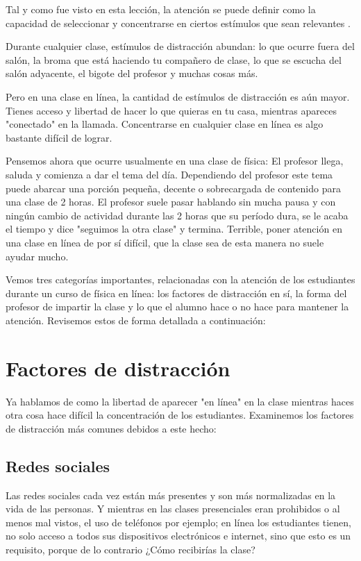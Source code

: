 Tal y como fue visto en esta lección, la atención se puede definir como la capacidad de seleccionar y concentrarse en ciertos estímulos que sean relevantes \cite{AtenCognifit}.

Durante cualquier clase, estímulos de distracción abundan: lo que  ocurre fuera del salón, la broma que está haciendo tu compañero de clase, lo que se escucha del salón adyacente, el bigote del profesor y muchas cosas más. 

Pero en una clase en línea, la cantidad de estímulos de distracción es aún mayor. Tienes acceso y libertad de hacer lo que quieras en tu casa, mientras apareces "conectado" en la llamada. Concentrarse en cualquier clase en línea es algo bastante difícil de lograr. 

Pensemos ahora que ocurre usualmente en una clase de física: El profesor llega, saluda y comienza a dar el tema del día. Dependiendo del profesor este tema puede abarcar una porción pequeña, decente o sobrecargada de contenido para una clase de 2 horas. El profesor suele pasar hablando sin mucha pausa y con ningún cambio de actividad durante las 2 horas que su período dura, se le acaba el tiempo y dice "seguimos la otra clase" y termina. Terrible, poner atención en una clase en línea de por sí difícil, que la clase sea de esta manera no suele ayudar mucho.

Vemos tres categorías importantes, relacionadas con la atención de los estudiantes durante un curso de física en línea: los factores de distracción en sí, la forma del profesor de impartir la clase y lo que el alumno hace o no hace para mantener la atención. Revisemos estos de forma detallada a continuación:

\section{Factores de distracción}

Ya hablamos de como la libertad de aparecer "en línea" en la clase mientras haces otra cosa hace difícil la concentración de los estudiantes. Examinemos los factores de distracción más comunes debidos a este hecho:

\subsection{Redes sociales}
Las redes sociales cada vez están más presentes y son más normalizadas en la vida de las personas. Y mientras en las clases presenciales eran prohibidos o al menos mal vistos, el uso de teléfonos por ejemplo; en línea los estudiantes tienen, no solo acceso a todos sus dispositivos electrónicos e internet, sino que esto es un requisito, porque de lo contrario ¿Cómo recibirías la clase?


